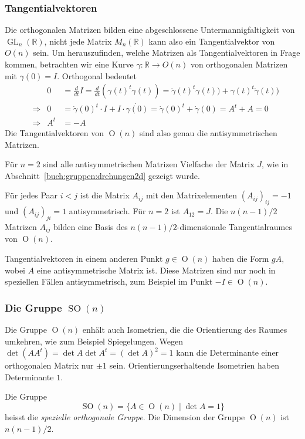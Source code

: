 \subsubsection{Tangentialvektoren}
Die orthogonalen Matrizen bilden eine abgeschlossene Untermannigfaltigkeit
von $\operatorname{GL}_n(\mathbb{R})$, nicht jede Matrix $M_n(\mathbb{R})$ 
kann also ein Tangentialvektor von $O(n)$ sein.
Um herauszufinden, welche Matrizen als Tangentialvektoren in Frage
kommen, betrachten wir eine Kurve $\gamma\colon\mathbb{R}\to O(n)$
von orthogonalen Matrizen mit $\gamma(0)=I$.
Orthogonal bedeutet 
\[
\begin{aligned}
&&
0
&=
\frac{d}{dt}I
=
\frac{d}{dt}
(\gamma(t)^t\gamma(t))
=
\dot{\gamma}(t)^t\gamma(t))
+
\gamma(t)^t\dot{\gamma}(t))
\\
&\Rightarrow&
0
&=
\dot{\gamma}(0)^t \cdot I + I\cdot \dot{\gamma(0)}
=
\dot{\gamma}(0)^t + \dot{\gamma}(0)
=
A^t+A=0
\\
&\Rightarrow&
A^t&=-A
\end{aligned}
\]
Die Tangentialvektoren von $\operatorname{O}(n)$ sind also genau
die antisymmetrischen Matrizen.

Für $n=2$ sind alle antisymmetrischen Matrizen Vielfache der Matrix
$J$, wie in Abschnitt~\ref{buch:gruppen:drehungen2d}
gezeigt wurde.

Für jedes Paar $i<j$ ist die Matrix $A_{ij}$ mit den Matrixelementen
$(A_{ij})_{ij}=-1$ und $(A_{ij})_{ji}=1$
antisymmetrisch.
Für $n=2$ ist $A_{12}=J$.
Die $n(n-1)/2$ Matrizen $A_{ij}$ bilden eine Basis des
$n(n-1)/2$-dimensionale Tangentialraumes von $\operatorname{O}(n)$.

Tangentialvektoren in einem anderen Punkt $g\in\operatorname{O}(n)$
haben die Form $gA$, wobei $A$ eine antisymmetrische Matrix ist.
Diese Matrizen sind nur noch in speziellen Fällen antisymmetrisch,
zum Beispiel im Punkt $-I\in\operatorname{O}(n)$.

\subsubsection{Die Gruppe $\operatorname{SO}(n)$}
Die Gruppe $\operatorname{O}(n)$ enhält auch Isometrien, die
die Orientierung des Raumes umkehren, wie zum Beispiel Spiegelungen.
Wegen $\det (AA^t)=\det A\det A^t = (\det A)^2=1$ kann die Determinante
einer orthogonalen Matrix nur $\pm 1$ sein.
Orientierungserhaltende Isometrien haben Determinante $1$.

Die Gruppe
\[
\operatorname{SO}(n)
=
\{A\in\operatorname{O}(n)\;|\; \det A=1\}
\]
heisst die {\em spezielle orthogonale Gruppe}.
Die Dimension der Gruppe $\operatorname{O}(n)$ ist $n(n-1)/2$.

